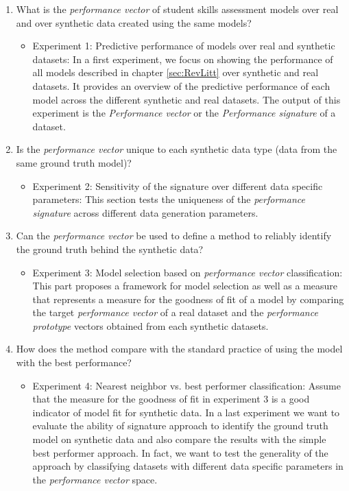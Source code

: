 \begin{enumerate}
\item What is the \textit{performance vector} of student skills assessment models over real and over synthetic data created using the same models?
\begin{itemize}
\item Experiment 1: Predictive performance of models over real and synthetic datasets: In a first experiment, we focus on showing the performance of all models described in chapter \ref{sec:RevLitt} over synthetic and real datasets. It provides an overview of the predictive performance of each model across the different synthetic and real datasets. The output of this experiment is the \textit{Performance vector} or the \textit{Performance signature} of a dataset.
\end{itemize}
\item Is the \textit{performance vector} unique to each synthetic data type (data from the same ground truth model)?
\begin{itemize}
\item Experiment 2: Sensitivity of the signature over different data specific parameters: This section tests the uniqueness of the \textit{performance signature} across different data generation parameters.
\end{itemize}
\item Can the \textit{performance vector} be used to define a method to reliably identify the ground truth behind the synthetic data?
\begin{itemize}
\item Experiment 3: Model selection based on \textit{performance vector} classification: This part proposes a framework for model selection as well as a measure that represents a measure for the goodness of fit of a model by comparing the target \textit{performance vector} of a real dataset and the \textit{performance prototype} vectors obtained from each synthetic datasets.
\end{itemize}
\item How does the method compare with the standard practice of using the model with the best performance?
\begin{itemize}

\item Experiment 4: Nearest neighbor vs. best performer classification: Assume that the measure for the goodness of fit in experiment 3 is a good indicator of model fit for synthetic data. In a last experiment we want to evaluate the ability of signature approach to identify the ground truth model on synthetic data and also compare the results with the simple best performer approach. In fact, we want to test the generality of the approach by classifying datasets with different data specific parameters in the \textit{performance vector} space. 


\end{itemize}
\end{enumerate}
